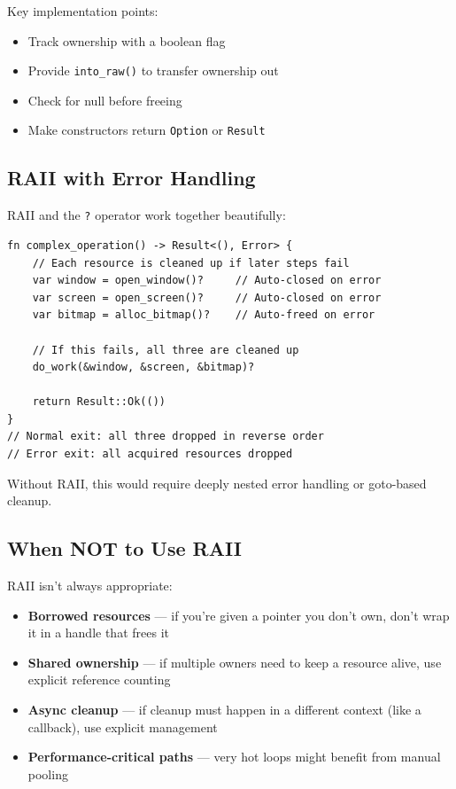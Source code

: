 Key implementation points:

\begin{itemize}
    \item Track ownership with a boolean flag
    \item Provide \texttt{into\_raw()} to transfer ownership out
    \item Check for null before freeing
    \item Make constructors return \texttt{Option} or \texttt{Result}
\end{itemize}

\subsection{RAII with Error Handling}

RAII and the \texttt{?} operator work together beautifully:

\begin{lstlisting}
fn complex_operation() -> Result<(), Error> {
    // Each resource is cleaned up if later steps fail
    var window = open_window()?     // Auto-closed on error
    var screen = open_screen()?     // Auto-closed on error
    var bitmap = alloc_bitmap()?    // Auto-freed on error

    // If this fails, all three are cleaned up
    do_work(&window, &screen, &bitmap)?

    return Result::Ok(())
}
// Normal exit: all three dropped in reverse order
// Error exit: all acquired resources dropped
\end{lstlisting}

Without RAII, this would require deeply nested error handling or goto-based cleanup.

\subsection{When NOT to Use RAII}

RAII isn't always appropriate:

\begin{itemize}
    \item \textbf{Borrowed resources} --- if you're given a pointer you don't own, don't wrap it in a handle that frees it
    \item \textbf{Shared ownership} --- if multiple owners need to keep a resource alive, use explicit reference counting
    \item \textbf{Async cleanup} --- if cleanup must happen in a different context (like a callback), use explicit management
    \item \textbf{Performance-critical paths} --- very hot loops might benefit from manual pooling
\end{itemize}

